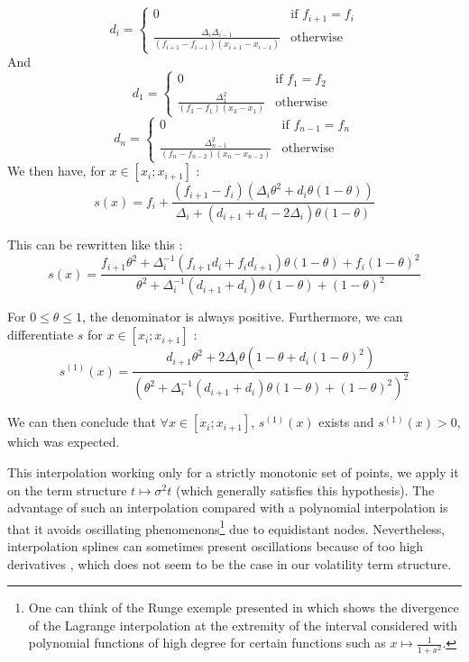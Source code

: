 \documentclass[a4paper,11pt,english]{book}
\begin{document}
$$d_i = \begin{cases}
0 & \text{if } f_{i+1}=f_i \\
\frac{\Delta_i\Delta_{i-1}}{(f_{i+1}-f_{i-1})(x_{i+1}-x_{i-1})} & \text{otherwise }
\end{cases}$$
\vspace{0.2cm}
And 
\vspace{0.2cm}
$$d_1 = \begin{cases}
0 & \text{if } f_{1}=f_2 \\
\frac{\Delta_1^2}{(f_{3}-f_{1})(x_{3}-x_{1})} & \text{otherwise }
\end{cases}$$
\vspace{0.2cm}
$$d_n = \begin{cases}
0 & \text{if } f_{n-1}=f_n \\
\frac{\Delta_{n-1}^2}{(f_{n}-f_{n-2})(x_{n}-x_{n-2})} & \text{otherwise }
\end{cases}$$
\newpage
We then have, for $x\in [x_i;x_{i+1}]$ : $$s(x) = f_i + \frac{(f_{i+1}-f_{i})(\Delta_i\theta^2+d_i\theta(1-\theta))}{\Delta_i+(d_{i+1}+d_i-2\Delta_i)\theta(1-\theta)}$$

This can be rewritten like this :
$$s(x)=\frac{f_{i+1}\theta^2 + \Delta_i^{-1}(f_{i+1}d_i+f_id_{i+1})\theta(1-\theta)+f_i(1-\theta)^2}{\theta^2+\Delta_i^{-1}(d_{i+1}+d_i)\theta(1-\theta)+(1-\theta)^2}$$

For $0 \leq \theta \leq 1$, the denominator is always positive. Furthermore, we can differentiate $s$ for $x\in[x_i;x_{i+1}]$ :
$$s^{(1)}(x) = \frac{d_{i+1}\theta^2+2\Delta_i\theta(1-\theta+d_i(1-\theta)^2)}{(\theta^2+\Delta_i^{-1}(d_{i+1}+d_i)\theta(1-\theta)+(1-\theta)^2)^2}$$

We can then conclude that $\forall x\in[x_i;x_{i+1}]$, $s^{(1)}(x)$ exists and $s^{(1)}(x)>0$, which was expected.

This interpolation working only for a strictly monotonic set of points, we apply it on the term structure $t \mapsto \sigma^2 t$ (which generally satisfies this hypothesis). The advantage of such an interpolation compared with a polynomial interpolation is that it avoids oscillating phenomenons\footnote{One can think of the Runge exemple presented in \cite{quarteroni2000methodes} which shows the divergence of the Lagrange interpolation at the extremity of the interval considered with polynomial functions of high degree for certain functions such as $x \mapsto \frac{1}{1+x^2}$.} due to equidistant nodes. Nevertheless, interpolation splines can sometimes present oscillations because of too high derivatives \cite{quarteroni2000methodes}, which does not seem to be the case in our volatility term structure. 
\end{document}
